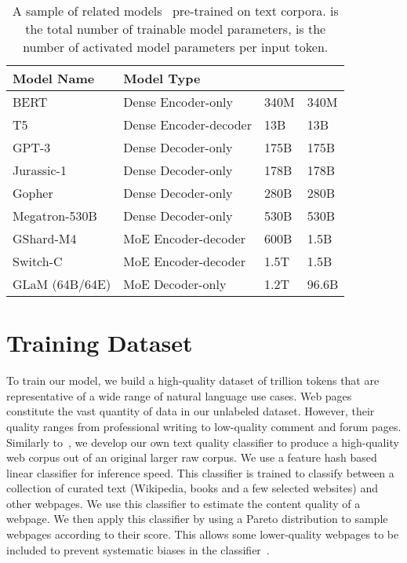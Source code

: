 \documentclass{article}
\begin{document}
\begin{table}[t]
{
\centering
\caption{A sample of related models~\cite{devlin2018bert,raffel2020exploring,NEURIPS2020_gpt3,lieber2021jurassic,gopher2021,shoeybi2019megatron,lepikhin2020gshard,fedus2021switch} pre-trained on text corpora.  is the total number of trainable model parameters,  is the number of activated model parameters per input token.}
	\label{tab:various-networks}
}
\vskip 0.1in
\small{
\begin{tabular}{p{2.2cm}p{3cm}p{0.75cm}p{0.9cm}}
\toprule
  Model Name & Model Type &  &    \\
\midrule
 BERT     & Dense Encoder-only       & 340M & 340M  \\
 T5      & Dense Encoder-decoder & 13B & 13B   \\ 
 GPT-3     & Dense Decoder-only      & 175B & 175B   \\ 
 Jurassic-1 & Dense Decoder-only & 178B & 178B \\
 Gopher & Dense Decoder-only & 280B & 280B \\
 Megatron-530B  & Dense Decoder-only         & 530B & 530B  \\ 
 GShard-M4  & MoE Encoder-decoder & 600B & 1.5B \\
 Switch-C & MoE Encoder-decoder & 1.5T & 1.5B   \\
 GLaM (64B/64E) & MoE Decoder-only & 1.2T & 96.6B   \\
 \bottomrule
\end{tabular}
}

\end{table}

\section{Training Dataset}
\label{sec:data}

To train our model, we  build a high-quality dataset of  trillion tokens that are representative of a wide range of natural language use cases. Web pages constitute the vast quantity of data in our unlabeled dataset. However, their quality ranges from professional writing to low-quality comment and forum pages. Similarly to~\citet{NEURIPS2020_gpt3}, we develop our own text quality classifier to produce a high-quality web corpus out of an original larger raw corpus. We use a feature hash based linear classifier for inference speed. This classifier is trained to classify between a collection of curated text (Wikipedia, books and a few selected websites) and other webpages. We use this classifier to estimate the content quality of a webpage. We then apply this classifier by using a Pareto distribution to sample webpages according to their score. This allows some lower-quality webpages to be included to prevent systematic biases in the classifier~\cite{NEURIPS2020_gpt3}.
\end{document}
